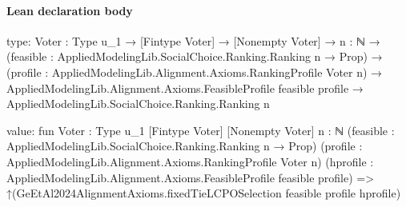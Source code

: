 \documentclass[10pt]{article}
\begin{document}
\paragraph{Lean declaration body}
\begin{ReviewVerbatim}
type:
{Voter : Type u_1} →
  [Fintype Voter] →
    [Nonempty Voter] →
      {n : ℕ} →
        (feasible : AppliedModelingLib.SocialChoice.Ranking.Ranking n → Prop) →
          (profile : AppliedModelingLib.Alignment.Axioms.RankingProfile Voter n) →
            AppliedModelingLib.Alignment.Axioms.FeasibleProfile feasible profile →
              AppliedModelingLib.SocialChoice.Ranking.Ranking n

value:
fun {Voter : Type u_1} [Fintype Voter] [Nonempty Voter] {n : ℕ}
    (feasible : AppliedModelingLib.SocialChoice.Ranking.Ranking n → Prop)
    (profile : AppliedModelingLib.Alignment.Axioms.RankingProfile Voter n)
    (hprofile : AppliedModelingLib.Alignment.Axioms.FeasibleProfile feasible profile) =>
  ↑(GeEtAl2024AlignmentAxioms.fixedTieLCPOSelection feasible profile hprofile)
\end{ReviewVerbatim}
\end{document}
